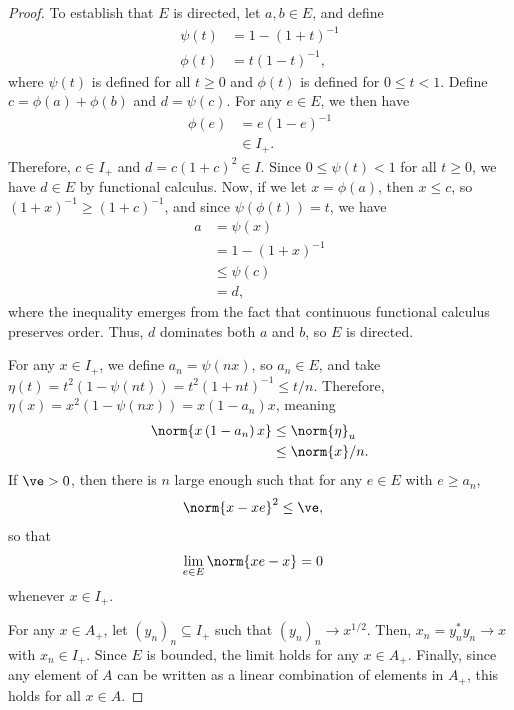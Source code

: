 \documentclass[10pt]{mypackage}
\begin{document}
\begin{proof}
  To establish that $E$ is directed, let $a,b\in E$, and define
  \begin{align*}
    \psi(t) &= 1-\left( 1+t \right)^{-1}\\
    \phi(t) &= t\left( 1-t \right)^{-1},
  \end{align*}
  where $\psi(t)$ is defined for all $t\geq 0$ and $\phi(t)$ is defined for $0\leq t < 1$. Define $c = \phi(a) + \phi(b)$ and $d = \psi(c)$. For any $e\in E$, we then have
  \begin{align*}
    \phi(e) &= e\left( 1-e \right)^{-1}\\
            &\in I_{+}.
  \end{align*}
  Therefore, $c\in I_{+}$ and $d = c\left( 1+c \right)^2\in I$. Since $0\leq \psi(t) < 1$ for all $t\geq 0$, we have $d\in E$ by functional calculus. Now, if we let $x = \phi(a)$, then $x \leq c$, so $\left( 1+x \right)^{-1} \geq \left( 1+c \right)^{-1}$, and since $\psi(\phi(t)) = t$, we have 
  \begin{align*}
    a &= \psi(x)\\
      &= 1-\left( 1+x \right)^{-1}\\
      &\leq \psi(c)\\
      &= d,
  \end{align*}
  where the inequality emerges from the fact that continuous functional calculus preserves order. Thus, $d$ dominates both $a$ and $b$, so $E$ is directed.

  For any $x\in I_{+}$, we define $a_n = \psi\left( nx \right)$, so $a_n\in E$, and take $\eta(t) = t^2\left( 1-\psi(nt) \right) = t^2\left( 1+nt \right)^{-1}\leq t/n$. Therefore, $\eta(x) = x^2\left( 1-\psi\left( nx \right) \right) = x\left( 1-a_n \right)x$, meaning
  \begin{align*}
    \norm{x\left( 1-a_n \right)x} &\leq \norm{\eta}_{u}\\
                                  &\leq \norm{x}/n.
  \end{align*}
  If $\ve > 0$, then there is $n$ large enough such that for any $e\in E$ with $e\geq a_n$,
  \begin{align*}
    \norm{x-xe}^2 &\leq \ve,
  \end{align*}
  so that
  \begin{align*}
    \lim_{e\in E}\norm{xe-x} &= 0
  \end{align*}
  whenever $x\in I_{+}$.

  For any $x\in A_{+}$, let $\left( y_n \right)_n\subseteq I_{+}$ such that $\left( y_n \right)_n\rightarrow x^{1/2}$. Then, $x_n = y_n^{\ast}y_n\rightarrow x$ with $x_n\in I_{+}$. Since $E$ is bounded, the limit holds for any $x\in A_{+}$. Finally, since any element of $A$ can be written as a linear combination of elements in $A_{+}$, this holds for all $x\in A$.
\end{proof}
\end{document}
